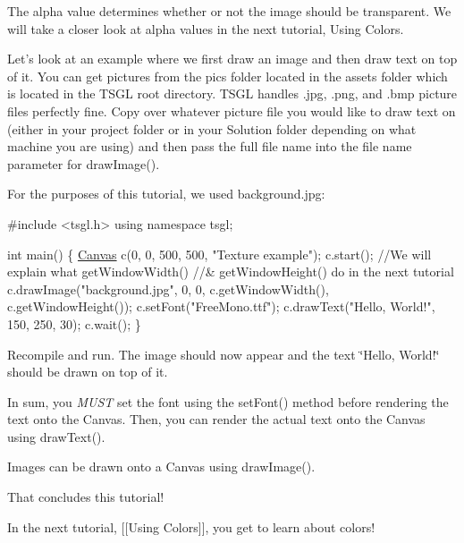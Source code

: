 The alpha value determines whether or not the image should be transparent. We will take a closer look at alpha values in the next tutorial, Using Colors.

Let's look at an example where we first draw an image and then draw text on top of it. You can get pictures from the {\ttfamily pics} folder located in the {\ttfamily assets} folder which is located in the T\-S\-G\-L root directory. T\-S\-G\-L handles {\ttfamily .jpg}, {\ttfamily .png}, and {\ttfamily .bmp} picture files perfectly fine. Copy over whatever picture file you would like to draw text on (either in your project folder or in your Solution folder depending on what machine you are using) and then pass the full file name into the file name parameter for {\ttfamily draw\-Image()}.

For the purposes of this tutorial, we used {\ttfamily background.\-jpg}\-:


\begin{DoxyCode}
\textcolor{preprocessor}{#include <tsgl.h>}
\textcolor{keyword}{using namespace }tsgl;

\textcolor{keywordtype}{int} main() \{
  \hyperlink{classtsgl_1_1_canvas}{Canvas} c(0, 0, 500, 500, \textcolor{stringliteral}{"Texture example"});
  c.start();
  \textcolor{comment}{//We will explain what getWindowWidth() }
  \textcolor{comment}{//& getWindowHeight() do in the next tutorial}
  c.drawImage(\textcolor{stringliteral}{"background.jpg"}, 0, 0, c.getWindowWidth(), c.getWindowHeight());
  c.setFont(\textcolor{stringliteral}{"FreeMono.ttf"});
  c.drawText(\textcolor{stringliteral}{"Hello, World!"}, 150, 250, 30);
  c.wait();
\}
\end{DoxyCode}
 Recompile and run. The image should now appear and the text \char`\"{}\-Hello, World!\char`\"{} should be drawn on top of it.

In sum, you {\itshape M\-U\-S\-T} set the font using the {\ttfamily set\-Font()} method before rendering the text onto the Canvas. Then, you can render the actual text onto the Canvas using {\ttfamily draw\-Text()}.

Images can be drawn onto a Canvas using {\ttfamily draw\-Image()}.

That concludes this tutorial!

In the next tutorial, \mbox{[}\mbox{[}Using Colors\mbox{]}\mbox{]}, you get to learn about colors! 